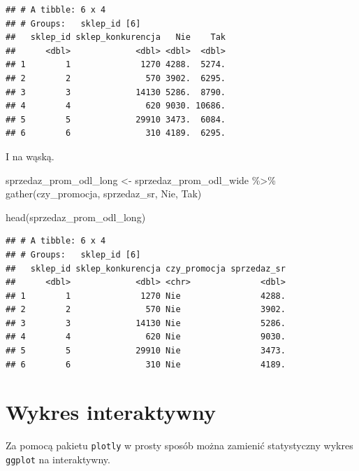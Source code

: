 \documentclass[
]{book}
\newenvironment{Shaded}{\begin{snugshade}}{\end{snugshade}}
\newcommand{\FunctionTok}[1]{\textcolor[rgb]{0.00,0.00,0.00}{#1}}
\newcommand{\NormalTok}[1]{#1}
\newcommand{\OtherTok}[1]{\textcolor[rgb]{0.56,0.35,0.01}{#1}}
\newcommand{\SpecialCharTok}[1]{\textcolor[rgb]{0.00,0.00,0.00}{#1}}
\begin{document}
\begin{verbatim}
## # A tibble: 6 x 4
## # Groups:   sklep_id [6]
##   sklep_id sklep_konkurencja   Nie    Tak
##      <dbl>             <dbl> <dbl>  <dbl>
## 1        1              1270 4288.  5274.
## 2        2               570 3902.  6295.
## 3        3             14130 5286.  8790.
## 4        4               620 9030. 10686.
## 5        5             29910 3473.  6084.
## 6        6               310 4189.  6295.
\end{verbatim}

I na wąską.

\begin{Shaded}
\begin{Highlighting}[]
\NormalTok{sprzedaz\_prom\_odl\_long }\OtherTok{\textless{}{-}}\NormalTok{ sprzedaz\_prom\_odl\_wide }\SpecialCharTok{\%\textgreater{}\%}
  \FunctionTok{gather}\NormalTok{(czy\_promocja, sprzedaz\_sr, Nie, Tak)}

\FunctionTok{head}\NormalTok{(sprzedaz\_prom\_odl\_long)}
\end{Highlighting}
\end{Shaded}

\begin{verbatim}
## # A tibble: 6 x 4
## # Groups:   sklep_id [6]
##   sklep_id sklep_konkurencja czy_promocja sprzedaz_sr
##      <dbl>             <dbl> <chr>              <dbl>
## 1        1              1270 Nie                4288.
## 2        2               570 Nie                3902.
## 3        3             14130 Nie                5286.
## 4        4               620 Nie                9030.
## 5        5             29910 Nie                3473.
## 6        6               310 Nie                4189.
\end{verbatim}

\hypertarget{wykres-interaktywny}{%
\section{Wykres interaktywny}\label{wykres-interaktywny}}

Za pomocą pakietu \texttt{plotly} w prosty sposób można zamienić statystyczny wykres \texttt{ggplot} na interaktywny.
\end{document}

